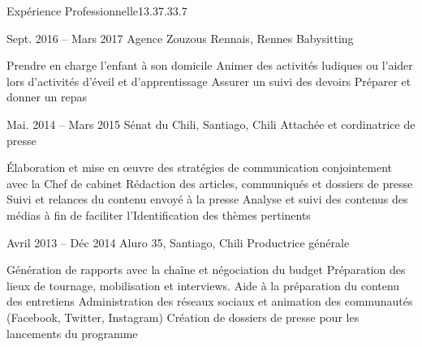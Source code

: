 \documentclass[30pt, french]{tccv}
\begin{document}
\begin{upshape}
\begin{flat_frame}{Expérience Professionnelle}{13.3}{7.3}{3.7}{}
\begin{eventlist}
\setlength{\parskip}{0pt}    
\item{Sept. 2016 -- Mars 2017 }     
  {Agence Zouzous Rennais, Rennes}     
  {Babysitting}
     \fontsize{9pt}{1em}\color{text}\bodyfontlight\upshape\selectfont

\begin{itemize}
      \cvitem[\checkmark]  Prendre en charge l’enfant à son domicile                                    
      \cvitem[\checkmark]  Animer des activités ludiques ou l’aider lors d’activités d’éveil et d’apprentissage                                            
      \cvitem[\checkmark]  Assurer un suivi des devoirs
      \cvitem[\checkmark]  Préparer et donner un repas

\end{itemize}       





  
\setlength{\parskip}{0pt}
\item{Mai. 2014 -- Mars 2015 }     
  {Sénat du Chili, Santiago, Chili}     
  {Attachée et cordinatrice de presse}
  \fontsize{9pt}{1em}\color{text}\bodyfontlight\upshape\selectfont

  
\begin{itemize}
      \cvitem[\checkmark] Élaboration et mise en œuvre des stratégies de communication conjointement avec la Chef de cabinet
      \cvitem[\checkmark] Rédaction des articles, communiqués et dossiers de presse
      \cvitem[\checkmark] Suivi et relances du contenu envoyé à la presse
      \cvitem[\checkmark] Analyse et suivi des contenus des médias à fin de faciliter l'Identification des thèmes pertinents
\end{itemize}        




\setlength{\parskip}{0pt}
\item{Avril 2013 -- Déc 2014 }     
  {Aluro 35, Santiago, Chili}     
  {Productrice générale}
\fontsize{9pt}{1em}\color{text}\bodyfontlight\upshape\selectfont

    
\begin{itemize}
      \cvitem[\checkmark] Génération de rapports avec la chaîne et négociation du budget                   
      \cvitem[\checkmark] Préparation des lieux de tournage, mobilisation et interviews. Aide à la préparation du contenu des entretiens   
      \cvitem[\checkmark] Administration des réseaux sociaux et animation des communautés (Facebook, Twitter, Instagram)                                                                    
      \cvitem[\checkmark] Création de dossiers de presse pour les lancements du programme      
\end{itemize}      
  



\end{eventlist}
\end{flat_frame}
\end{upshape}
\end{document}
